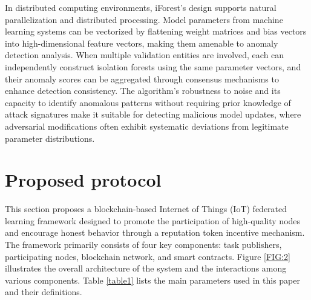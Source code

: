 \documentclass[a4paper]{cas-dc}
\begin{document}
In distributed computing environments, iForest's design supports natural parallelization and distributed processing. Model parameters from machine learning systems can be vectorized by flattening weight matrices and bias vectors into high-dimensional feature vectors, making them amenable to anomaly detection analysis. When multiple validation entities are involved, each can independently construct isolation forests using the same parameter vectors, and their anomaly scores can be aggregated through consensus mechanisms to enhance detection consistency. The algorithm's robustness to noise and its capacity to identify anomalous patterns without requiring prior knowledge of attack signatures make it suitable for detecting malicious model updates, where adversarial modifications often exhibit systematic deviations from legitimate parameter distributions.


\section{Proposed protocol}\label{sec:4}
This section proposes a blockchain-based Internet of Things (IoT) federated learning framework designed to promote the participation of high-quality nodes and encourage honest behavior through a reputation token incentive mechanism. The framework primarily consists of four key components: task publishers, participating nodes, blockchain network, and smart contracts. Figure \ref{FIG:2} illustrates the overall architecture of the system and the interactions among various components. Table \ref{table1} lists the main parameters used in this paper and their definitions.
\end{document}
